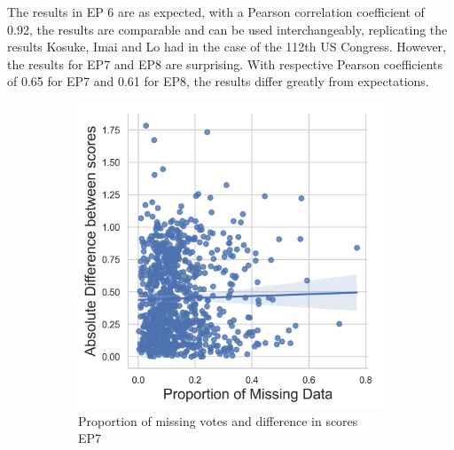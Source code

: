\documentclass[a4paper,12pt]{report}
\begin{document}
    The results in EP 6 are as expected, with a Pearson correlation coefficient of 0.92, the results are comparable
    and can be used interchangeably, replicating the results Kosuke, Imai and Lo had in the case of the 112th US
    Congress.
    However, the results for EP7 and EP8 are surprising.
    With respective Pearson coefficients of 0.65 for EP7 and 0.61 for EP8, the results differ greatly from expectations.
    \begin{figure}[H]
        \centering
        \begin{subfigure}[b]{0.48\textwidth}
            \centering
            \includegraphics[width=\textwidth]{Graphs/missingvsdiff7}
            \caption{Proportion of missing votes and difference in scores EP7}
            \label{fig:missingscatter7}
        \end{subfigure}
        \hfill
        \begin{subfigure}[b]{0.48\textwidth}
            \centering

\end{subfigure}
\end{figure}
\end{document}
